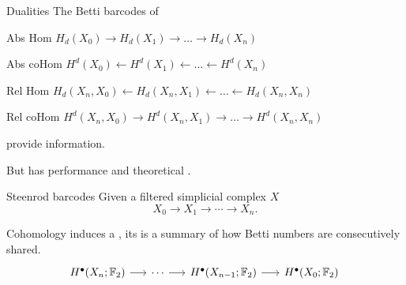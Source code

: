 \begin{frame}{Dualities}
	\pause
	The Betti barcodes of

	\medskip
	\quad Abs Hom\phantom{co} \qquad $H_d(X_0) \to H_d(X_1) \to\dots\to H_d(X_n)$

	\medskip
	\quad Abs coHom \!\qquad $H^d(X_0) \leftarrow H^d(X_1) \leftarrow\dots\leftarrow H^d(X_n)$

	\medskip
	\quad Rel Hom\phantom{co} \qquad $H_d(X_n,X_0) \leftarrow H_d(X_n,X_1) \leftarrow\dots\leftarrow H_d(X_n,X_n)$

	\medskip
	\quad Rel coHom \!\qquad $H^d(X_n,X_0) \to H^d(X_n,X_1) \to\dots\to H^d(X_n,X_n)$

	\medskip
	provide  information.

	\pause\medskip
	But  has performance and theoretical .
\end{frame}

\begin{frame}[fragile]{Steenrod barcodes}
	\pause
	Given a filtered simplicial complex $X$
	\[
	X_0 \to X_1 \to \cdots \to X_n.
	\]

	\pause
	Cohomology induces a , its  is a summary of how Betti numbers are consecutively shared.\\

	\smallskip
	\phantom{A cohomology operation induces an endomorphism}
	\[
	\begin{tikzcd}[column sep = 15]
		H^\bullet(X_n; \Ftwo) \arrow[r] & \cdots \arrow[r] & H^\bullet(X_{n-1}; \Ftwo) \arrow[r] & H^\bullet(X_0; \Ftwo) \\
		\phantom{H^\bullet(X_n; \Ftwo)} \arrow[u, "\phantom{\Sq^k}", phantom] & \phantom{\cdots} & \phantom{H^\bullet(X_{n-1}; \Ftwo)} & \phantom{H^\bullet(X_0; \Ftwo)} \arrow[u, "\phantom{\Sq^k}", phantom] \phantom{.}
	\end{tikzcd}
	\]
\end{frame}

